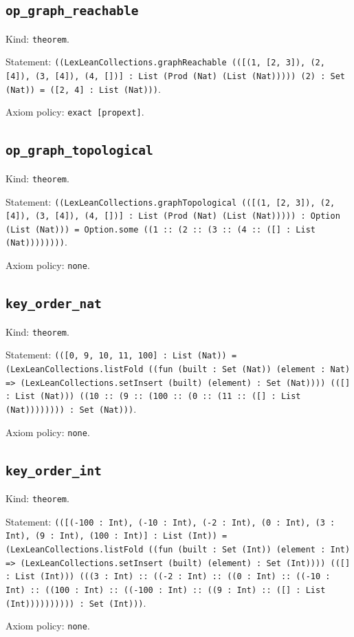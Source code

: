 \documentclass[11pt]{article}
\begin{document}
\subsection*{\texttt{op\_graph\_reachable}}
\noindent Kind: \texttt{theorem}.\par
\noindent Statement: \texttt{((LexLeanCollections.graphReachable (([(1, [2, 3]), (2, [4]), (3, [4]), (4, [])] : List (Prod (Nat) (List (Nat))))) (2) : Set (Nat)) = ([2, 4] : List (Nat)))}.\par
\noindent Axiom policy: \texttt{exact [propext]}.\par
\subsection*{\texttt{op\_graph\_topological}}
\noindent Kind: \texttt{theorem}.\par
\noindent Statement: \texttt{((LexLeanCollections.graphTopological (([(1, [2, 3]), (2, [4]), (3, [4]), (4, [])] : List (Prod (Nat) (List (Nat))))) : Option (List (Nat))) = Option.some ((1 :: (2 :: (3 :: (4 :: ([] : List (Nat))))))))}.\par
\noindent Axiom policy: \texttt{none}.\par
\subsection*{\texttt{key\_order\_nat}}
\noindent Kind: \texttt{theorem}.\par
\noindent Statement: \texttt{(([0, 9, 10, 11, 100] : List (Nat)) = (LexLeanCollections.listFold ((fun (built : Set (Nat)) (element : Nat) => (LexLeanCollections.setInsert (built) (element) : Set (Nat)))) (([] : List (Nat))) ((10 :: (9 :: (100 :: (0 :: (11 :: ([] : List (Nat)))))))) : Set (Nat)))}.\par
\noindent Axiom policy: \texttt{none}.\par
\subsection*{\texttt{key\_order\_int}}
\noindent Kind: \texttt{theorem}.\par
\noindent Statement: \texttt{(([(-100 : Int), (-10 : Int), (-2 : Int), (0 : Int), (3 : Int), (9 : Int), (100 : Int)] : List (Int)) = (LexLeanCollections.listFold ((fun (built : Set (Int)) (element : Int) => (LexLeanCollections.setInsert (built) (element) : Set (Int)))) (([] : List (Int))) (((3 : Int) :: ((-2 : Int) :: ((0 : Int) :: ((-10 : Int) :: ((100 : Int) :: ((-100 : Int) :: ((9 : Int) :: ([] : List (Int)))))))))) : Set (Int)))}.\par
\noindent Axiom policy: \texttt{none}.\par
\end{document}
